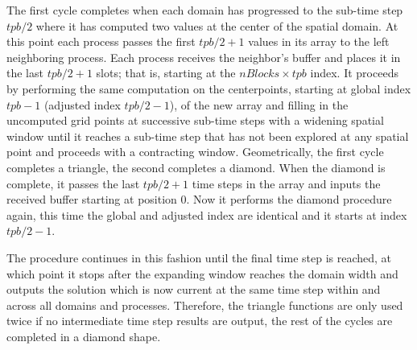 The first cycle completes when each domain has progressed to the sub-time step $tpb/2$
where it has computed two values at the center of the spatial domain.
At this point each process passes the first $tpb/2 + 1$ values in its array to the left neighboring process.
Each process receives the neighbor's buffer and places it in the last $tpb/2 + 1$ slots; that is, starting at the $nBlocks \times tpb$ index.
It proceeds by performing the same computation on the centerpoints, starting at global index $tpb-1$ (adjusted index $tpb/2-1$), of the new array and filling in the uncomputed grid points at successive sub-time steps with a widening spatial window until it reaches a sub-time step that has not been explored at any spatial point and proceeds with a contracting window.
Geometrically, the first cycle completes a triangle, the second completes a diamond.
When the diamond is complete, it passes the last $tpb/2 + 1$ time steps in the array and inputs the received buffer starting at position 0.
Now it performs the diamond procedure again, this time the global and adjusted index are identical and it starts at index $tpb/2 - 1$.

The procedure continues in this fashion until the final time step is reached, at which point it stops after the expanding window reaches the domain width and outputs the solution which is now current at the same time step within and across all domains and processes.
Therefore, the triangle functions are only used twice if no intermediate time step results are output, the rest of the cycles are completed in a diamond shape.